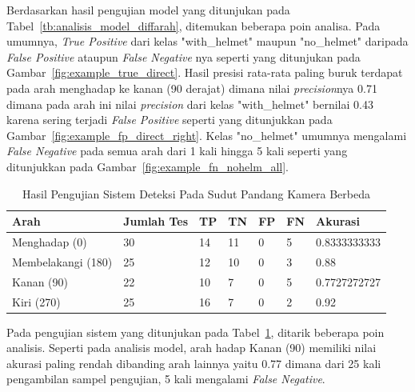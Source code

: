 \par Berdasarkan hasil pengujian model yang ditunjukan pada Tabel~\ref{tb:analisis_model_diffarah}, ditemukan beberapa poin analisa. Pada umumnya, \emph{True Positive} dari kelas "with\_helmet" maupun "no\_helmet" daripada \emph{False Positive} ataupun \emph{False Negative} nya seperti yang ditunjukan pada Gambar~\ref{fig:example_true_direct}. Hasil presisi rata-rata paling buruk terdapat pada arah menghadap ke kanan (90 derajat) dimana nilai \emph{precision}nya 0.71 dimana pada arah ini nilai \emph{precision} dari kelas "with\_helmet" bernilai 0.43 karena sering terjadi \emph{False Positive} seperti yang ditunjukkan pada Gambar~\ref{fig:example_fp_direct_right}. Kelas "no\_helmet" umumnya mengalami \emph{False Negative} pada semua arah dari 1 kali hingga 5 kali seperti yang ditunjukkan pada Gambar~\ref{fig:example_fn_nohelm_all}. 

\begin{table}
    \centering
    \caption{Hasil Pengujian Sistem Deteksi Pada Sudut Pandang Kamera Berbeda}
    \label{tb:analisis_sys_diffarah}
    \begin{tabular}{|l|l|l|l|l|l|l|} 
    \hline
    Arah               & Jumlah Tes & TP & TN & FP & FN & Akurasi       \\ 
    \hline
    Menghadap (0)      & 30         & 14 & 11 & 0  & 5  & 0.8333333333  \\ 
    \hline
    Membelakangi (180) & 25         & 12 & 10 & 0  & 3  & 0.88          \\ 
    \hline
    Kanan (90)         & 22         & 10 & 7  & 0  & 5  & 0.7727272727  \\ 
    \hline
    Kiri (270)         & 25         & 16 & 7  & 0  & 2  & 0.92          \\
    \hline
    \end{tabular}
\end{table}

\par Pada pengujian sistem yang ditunjukan pada Tabel~\ref{tb:analisis_sys_diffarah}, ditarik beberapa poin analisis. Seperti pada analisis model, arah hadap Kanan (90) memiliki nilai akurasi paling rendah dibanding arah lainnya yaitu 0.77 dimana dari 25 kali pengambilan sampel pengujian, 5 kali mengalami \emph{False Negative}.

